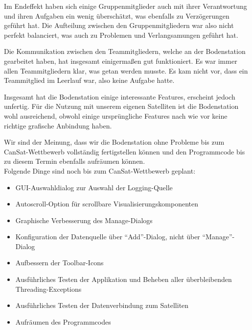 Im Endeffekt haben sich einige Gruppenmitglieder auch mit ihrer Verantwortung und ihren Aufgaben ein wenig überschätzt, was ebenfalls zu Verzögerungen geführt hat. Die Aufteilung zwischen den Gruppenmitgliedern war also nicht perfekt balanciert, was auch zu Problemen und Verlangsamungen geführt hat.

Die Kommunikation zwischen den Teammitgliedern, welche an der Bodenstation gearbeitet haben, hat insgesamt einigermaßen gut funktioniert. Es war immer allen Teammitgliedern klar, was getan werden musste. Es kam nicht vor, dass ein Teammitglied im Leerlauf war, also keine Aufgabe hatte.

Insgesamt hat die Bodenstation einige interessante Features, erscheint jedoch unfertig. Für die Nutzung mit unserem eigenen Satelliten ist die Bodenstation wohl ausreichend, obwohl einige ursprüngliche Features nach wie vor keine richtige grafische Anbindung haben.

Wir sind der Meinung, dass wir die Bodenstation ohne Probleme bis zum CanSat-Wettbewerb vollständig fertigstellen können und den Programmcode bis zu diesem Termin ebenfalls aufräumen können. \\
Folgende Dinge sind noch bis zum CanSat-Wettbewerb geplant:
\begin{itemize}
	\item GUI-Auswahldialog zur Auswahl der Logging-Quelle
	\item Autoscroll-Option für scrollbare Visualisierungskomponenten
	\item Graphische Verbesserung des Manage-Dialogs
	\item Konfiguration der Datenquelle über ``Add''-Dialog, nicht über ``Manage''-Dialog
	\item Aufbessern der Toolbar-Icons
	\item Ausführliches Testen der Applikation und Beheben aller überbleibenden Threading-Exceptions
	\item Ausführliches Testen der Datenverbindung zum Satelliten
	\item Aufräumen des Programmcodes
\end{itemize}

